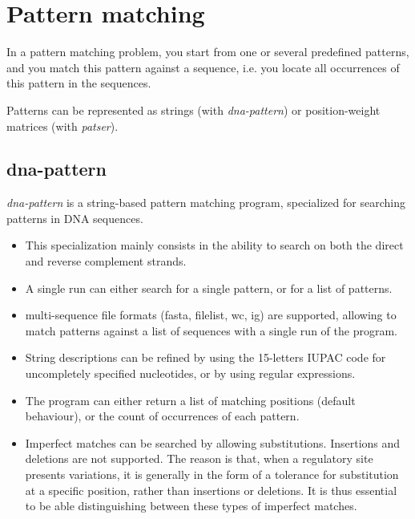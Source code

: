 \chapter{Pattern matching}

In a pattern matching problem, you start from one or several
predefined patterns, and you match this pattern against a sequence,
i.e. you locate all occurrences of this pattern in the sequences.

Patterns can be represented as strings (with \textit{dna-pattern}) or
position-weight matrices (with \textit{patser}). 

\section{dna-pattern}

\textit{dna-pattern} is a string-based pattern matching program,
specialized for searching patterns in DNA sequences. 

\begin{itemize}

\item 
This specialization mainly consists in the ability to search on both
the direct and reverse complement strands.

\item 
A single run can either search for a single pattern, or for a list
of patterns.

\item 
multi-sequence file formats (fasta, filelist, wc, ig) are supported,
allowing to match patterns against a list of sequences with a single
run of the program.

\item 
String descriptions can be refined by using the 15-letters IUPAC code
for uncompletely specified nucleotides, or by using regular
expressions.

\item 
The program can either return a list of matching positions (default
behaviour), or the count of occurrences of each pattern.

\item 
Imperfect matches can be searched by allowing
substitutions. Insertions and deletions are not supported.  The reason
is that, when a regulatory site presents variations, it is generally
in the form of a tolerance for substitution at a specific position,
rather than insertions or deletions. It is thus essential to be able
distinguishing between these types of imperfect matches.

\end{itemize}


